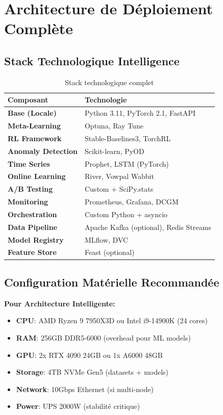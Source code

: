 \documentclass[12pt,a4paper]{article}
\begin{document}
\section{Architecture de Déploiement Complète}

\subsection{Stack Technologique Intelligence}

\begin{table}[H]
\centering
\small
\begin{tabular}{|l|l|}
\hline
\textbf{Composant} & \textbf{Technologie} \\
\hline
\textbf{Base (Locale)} & Python 3.11, PyTorch 2.1, FastAPI \\
\hline
\textbf{Meta-Learning} & Optuna, Ray Tune \\
\hline
\textbf{RL Framework} & Stable-Baselines3, TorchRL \\
\hline
\textbf{Anomaly Detection} & Scikit-learn, PyOD \\
\hline
\textbf{Time Series} & Prophet, LSTM (PyTorch) \\
\hline
\textbf{Online Learning} & River, Vowpal Wabbit \\
\hline
\textbf{A/B Testing} & Custom + SciPy.stats \\
\hline
\textbf{Monitoring} & Prometheus, Grafana, DCGM \\
\hline
\textbf{Orchestration} & Custom Python + asyncio \\
\hline
\textbf{Data Pipeline} & Apache Kafka (optional), Redis Streams \\
\hline
\textbf{Model Registry} & MLflow, DVC \\
\hline
\textbf{Feature Store} & Feast (optional) \\
\hline
\end{tabular}
\caption{Stack technologique complet}
\end{table}

\subsection{Configuration Matérielle Recommandée}

\textbf{Pour Architecture Intelligente:}
\begin{itemize}
    \item \textbf{CPU}: AMD Ryzen 9 7950X3D ou Intel i9-14900K (24 cores)
    \item \textbf{RAM}: 256GB DDR5-6000 (overhead pour ML models)
    \item \textbf{GPU}: 2x RTX 4090 24GB ou 1x A6000 48GB
    \item \textbf{Storage}: 4TB NVMe Gen5 (datasets + models)
    \item \textbf{Network}: 10Gbps Ethernet (si multi-node)
    \item \textbf{Power}: UPS 2000W (stabilité critique)
\end{itemize}
\end{document}
